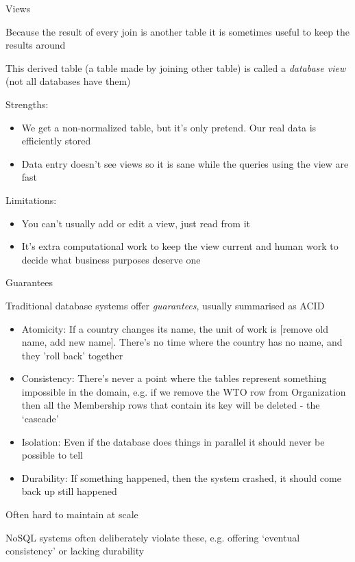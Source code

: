 \documentclass{hertieteaching}
\begin{document}
\begin{frame}{Views}

	Because the result of every join is another table it is sometimes useful to keep the results around
	
	This derived table (a table made by joining other table) is called a \textit{database view} (not all databases have them)
	
	Strengths:
	\begin{itemize}
  \item We get a non-normalized table, but it's only pretend. Our real data is efficiently stored
  \item Data entry doesn't see views so it is sane while the queries using the view are fast
\end{itemize}
	
	Limitations:
	\begin{itemize}
  \item You can't usually add or edit a view, just read from it
  \item It's extra computational work to keep the view current and human work to decide what business purposes deserve one
\end{itemize}
	
\end{frame}


\begin{frame}{Guarantees}

Traditional database systems offer \textit{guarantees}, usually summarised as ACID
\begin{itemize}
  \item Atomicity: If a country changes its name, the unit of work is [remove old name, add new name]. There's no time where the country has no name, and they 'roll back' together
  \item Consistency: There's never a point where the tables represent something impossible in the domain, e.g. if we remove the WTO row from \textsf{Organization} then all the \textsf{Membership} rows that contain its key will be deleted - the `cascade'
  \item Isolation: Even if the database does things in parallel it should never be possible to tell
  \item Durability: If something happened, then the system crashed, it should come back up still happened
\end{itemize}

Often hard to maintain at scale

NoSQL systems often deliberately violate these, e.g. offering `eventual consistency' or lacking durability
	
\end{frame}
\end{document}
